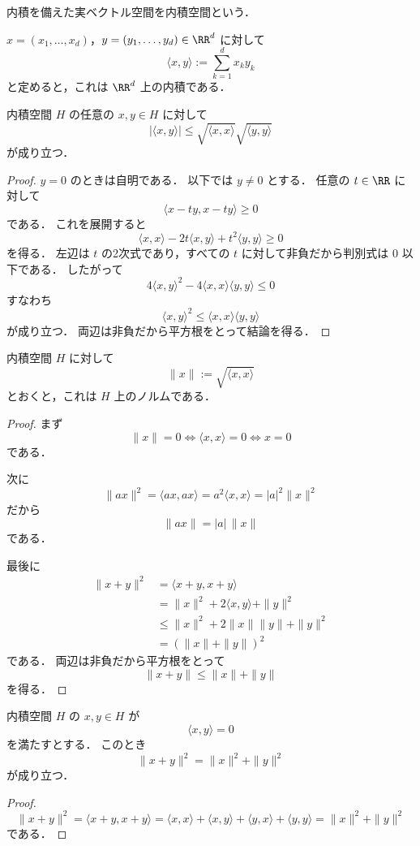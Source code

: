 \begin{definition}[内積空間]
内積を備えた実ベクトル空間を内積空間という．
\end{definition}

\begin{example}
$x=(x_1,\dots,x_d)$，$y=(y_1,\dots,y_d)\in\RR^d$ に対して
\[
\langle x,y\rangle:=\sum_{k=1}^d x_k y_k
\]
と定めると，これは $\RR^d$ 上の内積である．
\end{example}

\begin{theorem}
内積空間 $H$ の任意の $x,y\in H$ に対して
\[
|\langle x,y\rangle|
\le
\sqrt{\langle x,x\rangle}\sqrt{\langle y,y\rangle}
\]
が成り立つ．
\end{theorem}
\begin{proof}
$y=0$ のときは自明である．
以下では $y\ne 0$ とする．
任意の $t\in\RR$ に対して
\[
\langle x-ty,x-ty\rangle\ge 0
\]
である．
これを展開すると
\[
\langle x,x\rangle-2t\langle x,y\rangle+t^2\langle y,y\rangle\ge 0
\]
を得る．
左辺は $t$ の2次式であり，すべての $t$ に対して非負だから判別式は $0$ 以下である．
したがって
\[
4\langle x,y\rangle^2-4\langle x,x\rangle\langle y,y\rangle\le 0
\]
すなわち
\[
\langle x,y\rangle^2\le \langle x,x\rangle\langle y,y\rangle
\]
が成り立つ．
両辺は非負だから平方根をとって結論を得る．
\end{proof}

\begin{corollary}[内積から誘導されるノルム]
内積空間 $H$ に対して
\[
\|x\|:=\sqrt{\langle x,x\rangle}
\]
とおくと，これは $H$ 上のノルムである．
\end{corollary}
\begin{proof}
まず
\[
\|x\|=0
\iff
\langle x,x\rangle=0
\iff
x=0
\]
である．

次に
\[
\|ax\|^2=\langle ax,ax\rangle=a^2\langle x,x\rangle=|a|^2\|x\|^2
\]
だから
\[
\|ax\|=|a|\,\|x\|
\]
である．

最後に
\begin{align*}
\|x+y\|^2
&=
\langle x+y,x+y\rangle \\
&=
\|x\|^2+2\langle x,y\rangle+\|y\|^2 \\
&\le
\|x\|^2+2\|x\|\|y\|+\|y\|^2 \\
&=
(\|x\|+\|y\|)^2
\end{align*}
である．
両辺は非負だから平方根をとって
\[
\|x+y\|\le \|x\|+\|y\|
\]
を得る．
\end{proof}

\begin{proposition}[Pythagorasの定理]
内積空間 $H$ の $x,y\in H$ が
\[
\langle x,y\rangle=0
\]
を満たすとする．
このとき
\[
\|x+y\|^2=\|x\|^2+\|y\|^2
\]
が成り立つ．
\end{proposition}
\begin{proof}
\[
\|x+y\|^2
=
\langle x+y,x+y\rangle
=
\langle x,x\rangle+\langle x,y\rangle+\langle y,x\rangle+\langle y,y\rangle
=
\|x\|^2+\|y\|^2
\]
である．
\end{proof}

